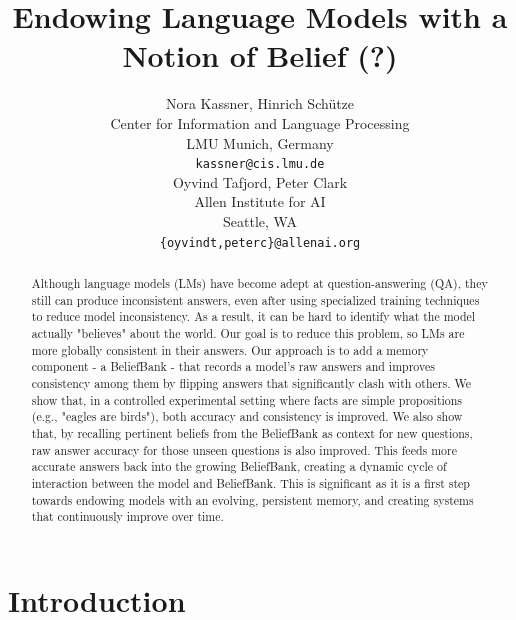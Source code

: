 \documentclass[11pt]{article}
\title{Endowing Language Models with a Notion of Belief (?)}
\author{Nora Kassner, Hinrich Sch{\"u}tze \\
Center for Information and Language Processing \\
LMU Munich, Germany \\
\texttt{kassner@cis.lmu.de} \\ \And
Oyvind Tafjord, Peter Clark \\
Allen Institute for AI \\
Seattle, WA \\
\texttt{\{oyvindt,peterc\}@allenai.org} \\
}
\begin{document}
\maketitle
\begin{abstract}
Although language models (LMs) have become adept at question-answering (QA), they
still can produce inconsistent answers, 
even after using specialized training techniques to reduce model inconsistency. As a result, it can be hard to identify
what the model actually
"believes" about the world. Our goal is to reduce this problem, so LMs are 
more globally consistent in their answers. Our approach is to add a memory
component - a BeliefBank - that records a model's raw answers and improves
consistency among them by flipping answers that significantly clash with others.
We show that, in a controlled experimental setting where facts are simple
propositions (e.g., "eagles are birds"), both accuracy and consistency
is improved. We also show that, by recalling pertinent beliefs from the
BeliefBank as context for new questions, raw answer accuracy for those unseen
questions is also improved. This feeds more accurate answers back into the growing
BeliefBank, creating a dynamic cycle of interaction between the model and BeliefBank.
This is significant as it is a first step towards endowing models with an evolving,
persistent memory, and creating systems that continuously improve over time.
\end{abstract}

\section{Introduction}
\end{document}
